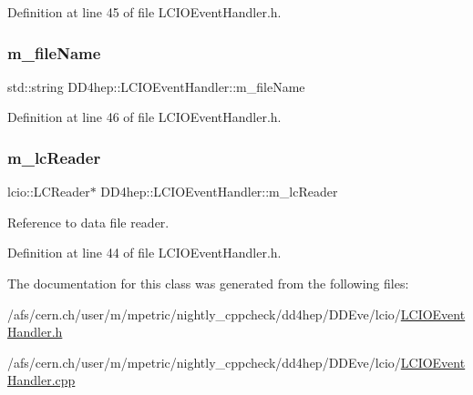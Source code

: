 Definition at line 45 of file L\+C\+I\+O\+Event\+Handler.\+h.

\hypertarget{class_d_d4hep_1_1_l_c_i_o_event_handler_ad46f1b438e65d08e5ebbe5bb8df25347}{}\label{class_d_d4hep_1_1_l_c_i_o_event_handler_ad46f1b438e65d08e5ebbe5bb8df25347} 
\subsubsection{\texorpdfstring{m\+\_\+file\+Name}{m\_fileName}}
{\footnotesize\ttfamily std\+::string D\+D4hep\+::\+L\+C\+I\+O\+Event\+Handler\+::m\+\_\+file\+Name\hspace{0.3cm}{\ttfamily [protected]}}



Definition at line 46 of file L\+C\+I\+O\+Event\+Handler.\+h.

\hypertarget{class_d_d4hep_1_1_l_c_i_o_event_handler_ae350f66667954755d793b2e4a41adbba}{}\label{class_d_d4hep_1_1_l_c_i_o_event_handler_ae350f66667954755d793b2e4a41adbba} 
\subsubsection{\texorpdfstring{m\+\_\+lc\+Reader}{m\_lcReader}}
{\footnotesize\ttfamily lcio\+::\+L\+C\+Reader$\ast$ D\+D4hep\+::\+L\+C\+I\+O\+Event\+Handler\+::m\+\_\+lc\+Reader\hspace{0.3cm}{\ttfamily [protected]}}



Reference to data file reader. 



Definition at line 44 of file L\+C\+I\+O\+Event\+Handler.\+h.



The documentation for this class was generated from the following files\+:\begin{DoxyCompactItemize}
\item 
/afs/cern.\+ch/user/m/mpetric/nightly\+\_\+cppcheck/dd4hep/\+D\+D\+Eve/lcio/\hyperlink{_l_c_i_o_event_handler_8h}{L\+C\+I\+O\+Event\+Handler.\+h}\item 
/afs/cern.\+ch/user/m/mpetric/nightly\+\_\+cppcheck/dd4hep/\+D\+D\+Eve/lcio/\hyperlink{_l_c_i_o_event_handler_8cpp}{L\+C\+I\+O\+Event\+Handler.\+cpp}\end{DoxyCompactItemize}
